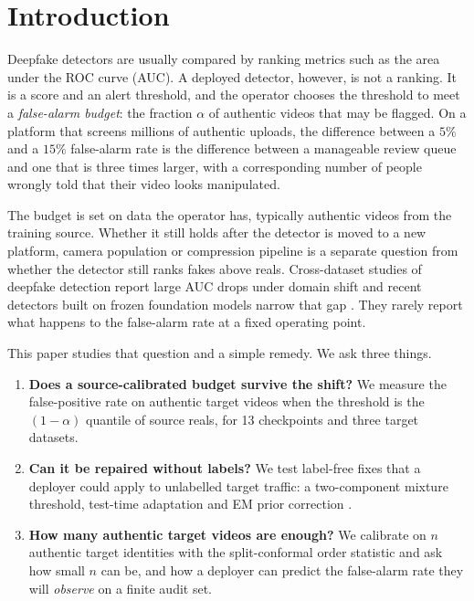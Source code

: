 \section{Introduction}
\label{sec:intro}

Deepfake detectors are usually compared by ranking metrics such as the area under the ROC curve (AUC). A deployed detector, however, is not a ranking. It is a score and an alert threshold, and the operator chooses the threshold to meet a \emph{false-alarm budget}: the fraction $\alpha$ of authentic videos that may be flagged. On a platform that screens millions of authentic uploads, the difference between a $5\%$ and a $15\%$ false-alarm rate is the difference between a manageable review queue and one that is three times larger, with a corresponding number of people wrongly told that their video looks manipulated.

The budget is set on data the operator has, typically authentic videos from the training source. Whether it still holds after the detector is moved to a new platform, camera population or compression pipeline is a separate question from whether the detector still ranks fakes above reals. Cross-dataset studies of deepfake detection report large AUC drops under domain shift \citep{li2020celeb,zi2020wilddeepfake} and recent detectors built on frozen foundation models narrow that gap \citep{ojha2023towards,yermakov2026gend}. They rarely report what happens to the false-alarm rate at a fixed operating point.

This paper studies that question and a simple remedy. We ask three things.
\begin{enumerate}[leftmargin=*,itemsep=1pt]
    \item \textbf{Does a source-calibrated budget survive the shift?} We measure the false-positive rate on authentic target videos when the threshold is the $(1-\alpha)$ quantile of source reals, for 13 checkpoints and three target datasets.
    \item \textbf{Can it be repaired without labels?} We test label-free fixes that a deployer could apply to unlabelled target traffic: a two-component mixture threshold, test-time adaptation \citep{wang2021tent} and EM prior correction \citep{saerens2002adjusting}.
    \item \textbf{How many authentic target videos are enough?} We calibrate on $n$ authentic target identities with the split-conformal order statistic \citep{vovk2012conditional,angelopoulos2023gentle} and ask how small $n$ can be, and how a deployer can predict the false-alarm rate they will \emph{observe} on a finite audit set.
\end{enumerate}

